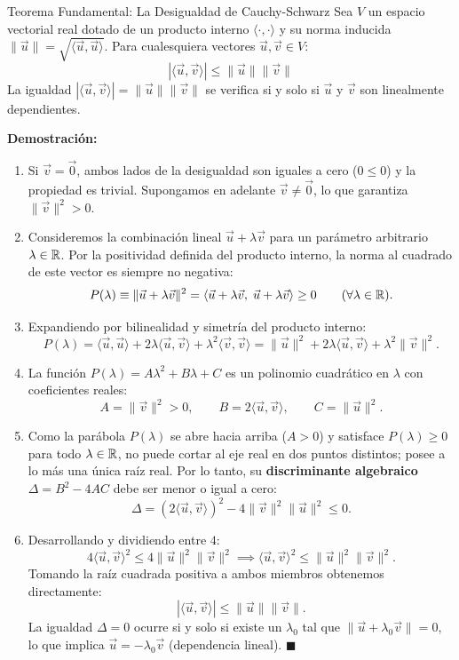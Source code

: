 \documentclass[11pt,letterpaper]{article}
\begin{document}
\begin{theorembox}{Teorema Fundamental: La Desigualdad de Cauchy-Schwarz}
Sea $V$ un espacio vectorial real dotado de un producto interno $\langle \cdot, \cdot \rangle$ y su norma inducida $\|\vec{u}\| = \sqrt{\langle \vec{u}, \vec{u} \rangle}$. Para cualesquiera vectores $\vec{u}, \vec{v} \in V$:
\[
\boxed{|\langle \vec{u}, \vec{v} \rangle| \le \|\vec{u}\| \|\vec{v}\|}
\]
La igualdad $|\langle \vec{u}, \vec{v} \rangle| = \|\vec{u}\|\|\vec{v}\|$ se verifica si y solo si $\vec{u}$ y $\vec{v}$ son linealmente dependientes.

\vspace{0.2cm}
\textbf{Demostración:}
\begin{enumerate}
    \item Si $\vec{v} = \vec{0}$, ambos lados de la desigualdad son iguales a cero ($0 \le 0$) y la propiedad es trivial. Supongamos en adelante $\vec{v} \neq \vec{0}$, lo que garantiza $\|\vec{v}\|^2 > 0$.
    \item Consideremos la combinación lineal $\vec{u} + \lambda\vec{v}$ para un parámetro arbitrario $\lambda \in \mathbb{R}$. Por la positividad definida del producto interno, la norma al cuadrado de este vector es siempre no negativa:
    \[
    P(\lambda) \equiv \|\vec{u} + \lambda\vec{v}\|^2 = \langle \vec{u} + \lambda\vec{v},\; \vec{u} + \lambda\vec{v} \rangle \ge 0 \qquad (\forall \lambda \in \mathbb{R}).
    \]
    \item Expandiendo por bilinealidad y simetría del producto interno:
    \[
    P(\lambda) = \langle \vec{u}, \vec{u} \rangle + 2\lambda\langle \vec{u}, \vec{v} \rangle + \lambda^2 \langle \vec{v}, \vec{v} \rangle = \|\vec{u}\|^2 + 2\lambda\langle \vec{u}, \vec{v} \rangle + \lambda^2 \|\vec{v}\|^2.
    \]
    \item La función $P(\lambda) = A\lambda^2 + B\lambda + C$ es un polinomio cuadrático en $\lambda$ con coeficientes reales:
    \[
    A = \|\vec{v}\|^2 > 0, \qquad B = 2\langle \vec{u}, \vec{v} \rangle, \qquad C = \|\vec{u}\|^2.
    \]
    \item Como la parábola $P(\lambda)$ se abre hacia arriba ($A > 0$) y satisface $P(\lambda) \ge 0$ para todo $\lambda \in \mathbb{R}$, no puede cortar al eje real en dos puntos distintos; posee a lo más una única raíz real. Por lo tanto, su \textbf{discriminante algebraico} $\Delta = B^2 - 4AC$ debe ser menor o igual a cero:
    \[
    \Delta = (2\langle \vec{u}, \vec{v} \rangle)^2 - 4\|\vec{v}\|^2 \|\vec{u}\|^2 \le 0.
    \]
    \item Desarrollando y dividiendo entre $4$:
    \[
    4\langle \vec{u}, \vec{v} \rangle^2 \le 4\|\vec{u}\|^2 \|\vec{v}\|^2 \implies \langle \vec{u}, \vec{v} \rangle^2 \le \|\vec{u}\|^2 \|\vec{v}\|^2.
    \]
    Tomando la raíz cuadrada positiva a ambos miembros obtenemos directamente:
    \[
    |\langle \vec{u}, \vec{v} \rangle| \le \|\vec{u}\|\|\vec{v}\|.
    \]
    La igualdad $\Delta = 0$ ocurre si y solo si existe un $\lambda_0$ tal que $\|\vec{u} + \lambda_0\vec{v}\| = 0$, lo que implica $\vec{u} = -\lambda_0\vec{v}$ (dependencia lineal). \hfill $\blacksquare$
\end{enumerate}
\end{theorembox}
\end{document}
